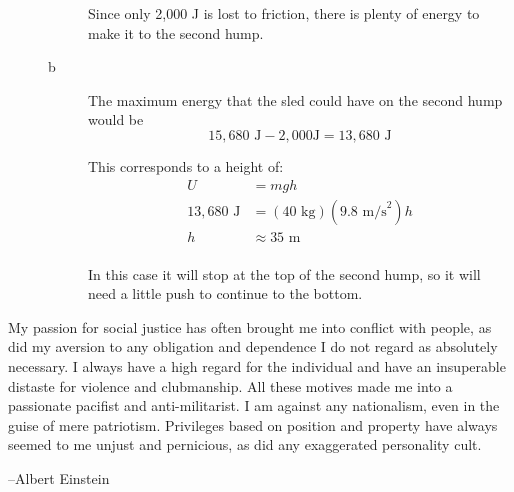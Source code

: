 \documentclass{exam}
\begin{document}
\begin{description}
\begin{description}
Since only 2,000 J is lost to friction, there is plenty of energy to make it to the second hump.

\item[b]
The maximum energy that the sled could have on the second hump would be
\[
  15,680 \text{ J} - 2,000 \text{J} = 13,680 \text{ J}
\]

This corresponds to a height of:
\begin{align*}
  U &= mgh \\
  13,680 \text{ J} &= (40 \text{ kg})(9.8 \text{ m/s}^2) h \\
  h &\approx 35 \text{ m} \\
\end{align*}

In this case it will stop at the top of the second hump, so it will need a little push to continue to the bottom.

\end{description}
\end{description}

\fi







\vspace{0.3 in}

\ifprintanswers
\else
\begin{em}
  My passion for social justice has often brought me into conflict with people, as did my aversion to any obligation and
  dependence I do not regard as absolutely necessary. 
  I always have a high regard for the individual and have an
  insuperable distaste for violence and clubmanship.  All these motives made me into a passionate pacifist and
  anti-militarist. I am against any nationalism, even in the guise of mere patriotism. Privileges based on position and
  property have always seemed to me unjust and pernicious, as did any exaggerated personality cult.
\end{em}

\vspace{.2 cm}
\hspace{1.5 cm} --Albert Einstein

\fi
\end{document}
